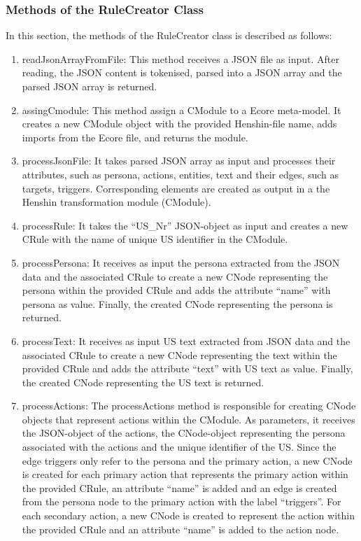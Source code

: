 \subsubsection*{Methods of the RuleCreator Class}
In this section, the methods of the RuleCreator class is described as follows:
\begin{enumerate}
	\item readJsonArrayFromFile: This method receives a JSON file as input. After reading, the JSON content is tokenised, parsed into a JSON array and the parsed JSON array is returned.
	\item assingCmodule: This method assign a CModule to a Ecore meta-model. It creates a new CModule object with the provided Henshin-file name, adds imports from the Ecore file, and returns the module.
	\item processJsonFile: It takes parsed JSON array as input and processes their attributes, such as persona, actions, entities, text and their edges, such as targets, triggers. Corresponding elements are created as output in a the Henshin transformation module (CModule).
	\item processRule: It takes the \enquote{US\_Nr} JSON-object as input and creates a new CRule with the name of unique US identifier in the CModule.
	\item processPersona: It receives as input the persona extracted from the JSON data and the associated CRule to create a new CNode representing the persona within the provided CRule and adds the attribute \enquote{name} with persona as value. Finally, the created CNode representing the persona is returned.
	\item processText: It receives as input US text extracted from JSON data and the associated CRule to create a new CNode representing the text within the provided CRule and adds the attribute \enquote{text} with US text as value. Finally, the created CNode representing the US text is returned.
	\item processActions: The processActions method is responsible for creating CNode objects that represent actions within the CModule. As parameters, it receives the JSON-object of the actions, the CNode-object representing the persona associated with the actions and the unique identifier of the US. Since the edge triggers only refer to the persona and the primary action, a new CNode is created for each primary action that represents the primary action within the provided CRule, an attribute \enquote{name} is added and an edge is created from the persona node to the primary action with the label \enquote{triggers}. For each secondary action, a new CNode is created to represent the action within the provided CRule and an attribute \enquote{name} is added to the action node.

\end{enumerate}
